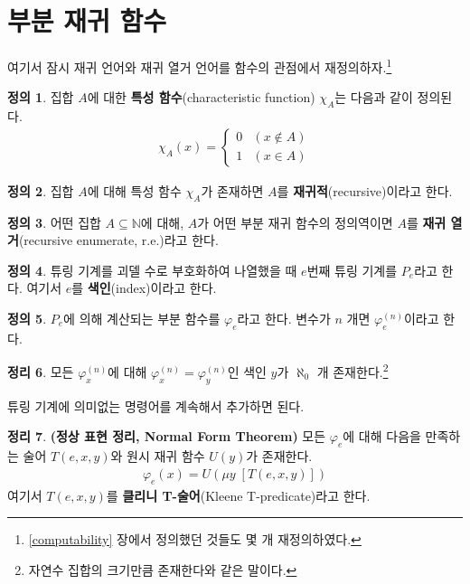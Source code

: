 \documentclass[b5paper, 11pt]{book}
\theoremstyle{definition}
\newtheorem{defn}{정의}[chapter]
\newtheorem{thm}[defn]{정리}
\newenvironment{pf*}{\pushQED{\qed}\pf}
{\popQED\endpf}
\begin{document}
\section{부분 재귀 함수}
여기서 잠시 재귀 언어와 재귀 열거 언어를 함수의 관점에서 재정의하자.\footnote{\ref{computability} 장에서 정의했던 것들도 몇 개 재정의하였다.}
\begin{defn}
집합 $A$에 대한 \textbf{특성 함수}(characteristic function) $\chi_A$는 다음과 같이 정의된다.
    \begin{align*}
        \chi_A(x) = 
        \begin{cases}
            0 & (x \notin A) \\ 
            1 & (x \in A)
        \end{cases}
    \end{align*}
\end{defn}
\begin{defn}
    집합 $A$에 대해 특성 함수 $\chi_A$가 존재하면 $A$를 \textbf{재귀적}(recursive)이라고 한다. 
\end{defn}
\begin{defn}
    어떤 집합 $A \subseteq \mathbb{N}$에 대해, $A$가 어떤 부분 재귀 함수의 정의역이면 $A$를 \textbf{재귀 열거}(recursive enumerate, r.e.)라고 한다.
\end{defn}
\begin{defn}
    튜링 기계를 괴델 수로 부호화하여 나열했을 때 $e$번째 튜링 기계를 $P_e$라고 한다. 여기서 $e$를 \textbf{색인}(index)이라고 한다.
\end{defn}
\begin{defn}
    $P_e$에 의해 계산되는 부분 함수를 $\varphi_e$라고 한다. 변수가 $n$ 개면 $\varphi_e^{(n)}$이라고 한다.
\end{defn}
\begin{thm}
    모든 $\varphi_x^{(n)}$에 대해 $\varphi_x^{(n)} = \varphi_y^{(n)}$인 색인 $y$가 $\aleph_0$ 개 존재한다.\footnote{자연수 집합의 크기만큼 존재한다와 같은 말이다.}
\end{thm}
\begin{pf*}
    튜링 기계에 의미없는 명령어를 계속해서 추가하면 된다.
\end{pf*}
\begin{thm}
    \textbf{(정상 표현 정리, Normal Form Theorem)} 모든 $\varphi_e$에 대해 다음을 만족하는 술어 $T(e, x, y )$와 원시 재귀 함수 $U(y)$가 존재한다.
    \begin{align*}
        \varphi_e (x) = U (\mu y \; [T(e,x,y)])
    \end{align*}
    여기서 $T(e, x, y)$를 \textbf{클리니 T-술어}(Kleene T-predicate)라고 한다.
\end{thm}
\end{document}
